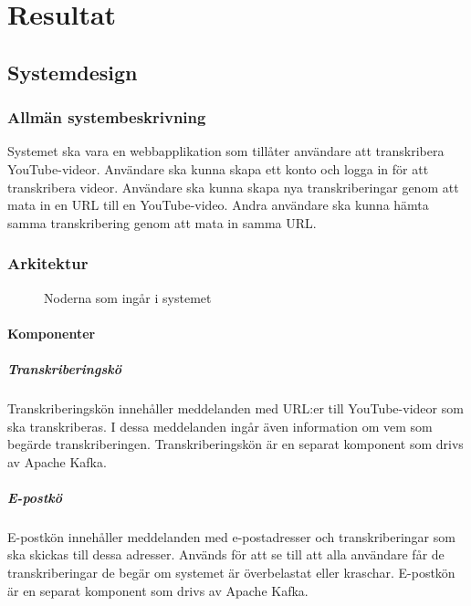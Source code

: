 \chapter{Resultat}

\section{Systemdesign}

\subsection{Allmän systembeskrivning}
Systemet ska vara en webbapplikation som tillåter användare att transkribera
YouTube-videor. Användare ska kunna skapa ett konto och logga in för att
transkribera videor. Användare ska kunna skapa nya transkriberingar genom att
mata in en URL till en YouTube-video. Andra användare ska kunna hämta samma
transkribering genom att mata in samma URL.

\subsection{Arkitektur}

\begin{figure}[h]
    \centering
    
    \caption{Noderna som ingår i systemet}
    \label{fig:system-nodes}
\end{figure}

\subsubsection{Komponenter}

\paragraph{Transkriberingskö}
Transkriberingskön innehåller meddelanden med URL:er till YouTube-videor som
ska transkriberas. I dessa meddelanden ingår även information om vem som
begärde transkriberingen. Transkriberingskön är en separat komponent som drivs
av Apache Kafka.

\paragraph{E-postkö}
E-postkön innehåller meddelanden med e-postadresser och transkriberingar som
ska skickas till dessa adresser. Används för att se till att alla användare
får de transkriberingar de begär om systemet är överbelastat eller kraschar.
E-postkön är en separat komponent som drivs av Apache Kafka.

